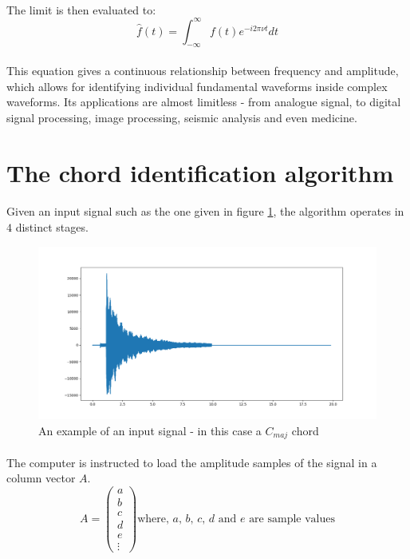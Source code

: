 \documentclass{article}
\begin{document}
\paragraph*{}
The limit is then evaluated to:
$$\hat{f} (t) = \int_{-\infty}^{\infty} f(t) e^{-i 2 \pi \nu t} dt$$

\paragraph*{}
This equation gives a continuous relationship between frequency and amplitude,
which allows for identifying individual fundamental waveforms inside complex
waveforms. Its applications are almost limitless - from analogue signal, to
digital signal processing, image processing, seismic analysis and even medicine.

\section{The chord identification algorithm}

\paragraph*{} 
Given an input signal such as the one given in figure \ref{fig:input-signal}, 
the algorithm operates in $4$ distinct stages.
\begin{figure}[ht] 
	\centering
	\includegraphics[width=\textwidth]{img/input-signal}
	\caption{An example of an input signal - in this case a $C_{maj}$ chord}
	\label{fig:input-signal}
\end{figure}

\paragraph*{}
The computer is instructed to load the amplitude samples of the signal in a 
column vector $A$.
$$A =
\begin{pmatrix}
	a \\
	b \\
	c \\
	d \\
	e \\
	\vdots
\end{pmatrix}\text{where, $a$, $b$, $c$, $d$ and $e$ are sample values}
$$
\end{document}
